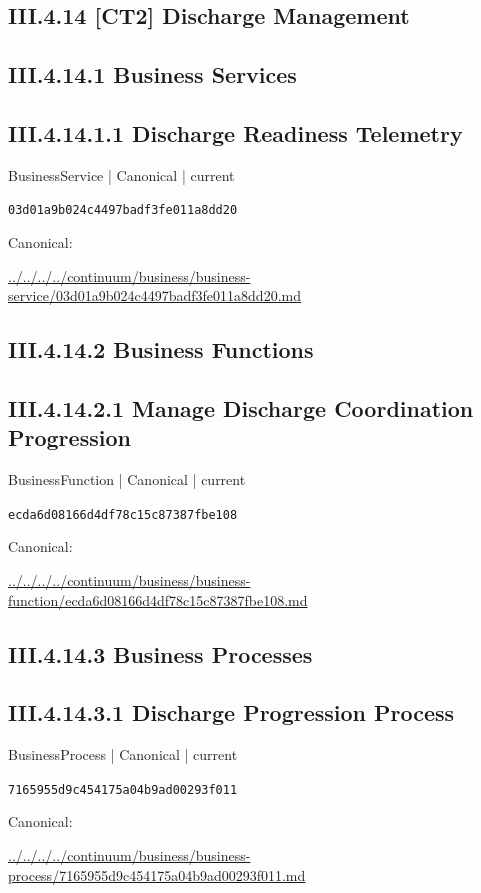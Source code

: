 \documentclass[10pt,a4paper]{article}
\begin{document}
\subsection*{III.4.14 [CT2] Discharge Management}
\subsection*{III.4.14.1 Business Services}
\subsection*{III.4.14.1.1 Discharge Readiness Telemetry}
{\small BusinessService | Canonical | current}\par
\texttt{03d01a9b024c4497badf3fe011a8dd20}\par
Canonical: \par
{\footnotesize\url{../../../../continuum/business/business-service/03d01a9b024c4497badf3fe011a8dd20.md}}\par
\subsection*{III.4.14.2 Business Functions}
\subsection*{III.4.14.2.1 Manage Discharge Coordination Progression}
{\small BusinessFunction | Canonical | current}\par
\texttt{ecda6d08166d4df78c15c87387fbe108}\par
Canonical: \par
{\footnotesize\url{../../../../continuum/business/business-function/ecda6d08166d4df78c15c87387fbe108.md}}\par
\subsection*{III.4.14.3 Business Processes}
\subsection*{III.4.14.3.1 Discharge Progression Process}
{\small BusinessProcess | Canonical | current}\par
\texttt{7165955d9c454175a04b9ad00293f011}\par
Canonical: \par
{\footnotesize\url{../../../../continuum/business/business-process/7165955d9c454175a04b9ad00293f011.md}}\par
\end{document}
